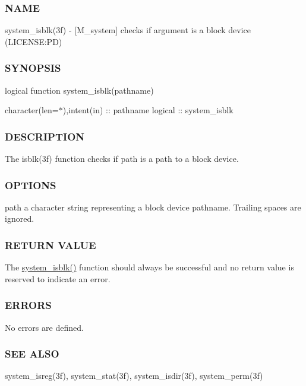 \subsubsection*{N\+A\+ME}

system\+\_\+isblk(3f) -\/ \mbox{[}M\+\_\+system\mbox{]} checks if argument is a block device (L\+I\+C\+E\+N\+SE\+:PD) 

\subsubsection*{S\+Y\+N\+O\+P\+S\+IS}

logical function system\+\_\+isblk(pathname)

character(len=$\ast$),intent(in) \+:\+: pathname logical \+:\+: system\+\_\+isblk

\subsubsection*{D\+E\+S\+C\+R\+I\+P\+T\+I\+ON}

The isblk(3f) function checks if path is a path to a block device.

\subsubsection*{O\+P\+T\+I\+O\+NS}

path a character string representing a block device pathname. Trailing spaces are ignored.

\subsubsection*{R\+E\+T\+U\+RN V\+A\+L\+UE}

The \mbox{\hyperlink{namespacem__system_a791fa587005ec07cbcd7b0045ee6f43f}{system\+\_\+isblk()}} function should always be successful and no return value is reserved to indicate an error.

\subsubsection*{E\+R\+R\+O\+RS}

No errors are defined.

\subsubsection*{S\+EE A\+L\+SO}

system\+\_\+isreg(3f), system\+\_\+stat(3f), system\+\_\+isdir(3f), system\+\_\+perm(3f)

